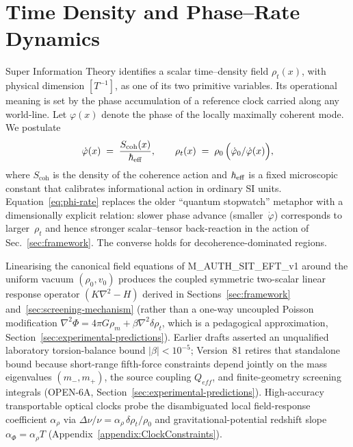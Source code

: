 \documentclass[american,11pt,letterpaper]{article}
\def\mathcal#1{#1}%
\def\mathrm#1{#1}%
\def\texttt#1{#1}%
\def\emph#1{#1}%
\begin{document}
\section{Time Density and Phase--Rate Dynamics}\label{sec:timedensity}

Super Information Theory identifies a scalar \emph{time--density field} $\rho_t(x)$, with physical dimension $[\mathrm{T}^{-1}]$, as one of its two primitive variables.  Its operational meaning is set by the phase accumulation of a reference clock carried along any world-line.  Let $\varphi(x)$ denote the phase of the locally maximally coherent mode.  We postulate
\begin{equation}\label{eq:phi-rate}
    \dot{\varphi}(x)\;=\;\frac{S_{\text{coh}}(x)}{\hbar_{\rm eff}},
    \qquad
    \rho_t(x)\;=\;\rho_0\,\Bigl(\dot{\varphi}_0/\dot{\varphi}(x)\Bigr),
\end{equation}
where $S_{\text{coh}}$ is the density of the coherence action and $\hbar_{\rm eff}$ is a fixed microscopic constant that calibrates informational action in ordinary SI units.  Equation~\eqref{eq:phi-rate} replaces the older ``quantum stopwatch'' metaphor with a dimensionally explicit relation: slower phase advance (smaller~$\dot{\varphi}$) corresponds to larger~$\rho_t$ and hence stronger scalar--tensor back-reaction in the action of Sec.~\ref{sec:framework}.  The converse holds for decoherence-dominated regions.

Linearising the canonical field equations of \texttt{M\_AUTH\_SIT\_EFT\_v1} around the uniform vacuum $(\rho_0, v_0)$ produces the coupled symmetric two-scalar linear response operator $(K\nabla^2 - H)$ derived in Sections~\ref{sec:framework} and~\ref{sec:screening-mechanism} (rather than a one-way uncoupled Poisson modification $\nabla^2\Phi = 4\pi G\rho_m + \beta\nabla^2\delta\rho_t$, which is a pedagogical approximation, Section~\ref{sec:experimental-predictions}). Earlier drafts asserted an unqualified laboratory torsion-balance bound $|\beta| < 10^{-5}$; Version~81 retires that standalone bound because short-range fifth-force constraints depend jointly on the mass eigenvalues $(m_-, m_+)$, the source coupling $Q_{\mathrm{eff}}$, and finite-geometry screening integrals (\texttt{OPEN-6A}, Section~\ref{sec:experimental-predictions}). High-accuracy transportable optical clocks probe the disambiguated local field-response coefficient $\alpha_\rho$ via $\Delta\nu/\nu = \alpha_\rho\,\delta\rho_t/\rho_0$ and gravitational-potential redshift slope $\alpha_\Phi = \alpha_\rho\mathcal{T}$ (Appendix~\ref{appendix:ClockConstraints}).
\end{document}
